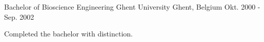 \begin{cventries}
  \cventry
    {Bachelor of Bioscience Engineering} %
    {Ghent University} %
    {Ghent, Belgium} %
    {Okt. 2000 - Sep. 2002} %
    {
      \begin{cvitems} %
        \item {Completed the bachelor with distinction.}
      \end{cvitems}
    }

\end{cventries}
